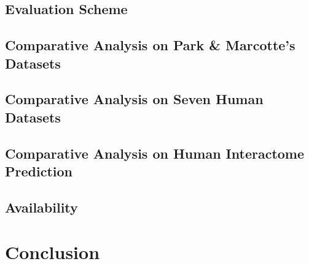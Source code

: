 \subsection{Evaluation Scheme}
\subsection{Comparative Analysis on Park \& Marcotte’s Datasets}
\subsection{Comparative Analysis on Seven Human Datasets}
\subsection{Comparative Analysis on Human Interactome Prediction}
\subsection{Availability}
\section{Conclusion}
